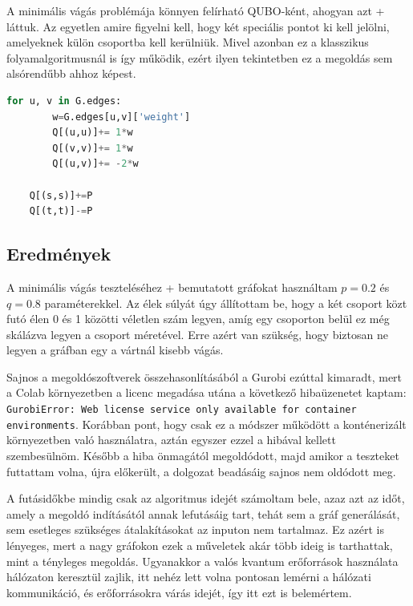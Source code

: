A minimális vágás problémája könnyen felírható QUBO-ként, ahogyan azt \az+ láttuk. Az egyetlen amire figyelni kell, hogy két speciális pontot ki kell jelölni, amelyeknek külön csoportba kell kerülniük. Mivel azonban ez a klasszikus folyamalgoritmusnál is így működik, ezért ilyen tekintetben ez a megoldás sem alsórendűbb ahhoz képest.

\begin{lstlisting}[language=python,caption=Minimális vágás QUBO előállítása,label=code:minCutQUBO]
	for u, v in G.edges:
		w=G.edges[u,v]['weight']
		Q[(u,u)]+= 1*w
		Q[(v,v)]+= 1*w
		Q[(u,v)]+= -2*w
	
	Q[(s,s)]+=P
	Q[(t,t)]-=P
\end{lstlisting}


\subsection{Eredmények}

A minimális vágás teszteléséhez \az+ bemutatott gráfokat használtam $p=0.2$ és $q=0.8$ paraméterekkel. Az élek súlyát úgy állítottam be, hogy a két csoport közt futó élen 0 és 1 közötti véletlen szám legyen, amíg egy csoporton belül ez még skálázva legyen a csoport méretével. Erre azért van szükség, hogy biztosan ne legyen a gráfban egy a vártnál kisebb vágás.

Sajnos a megoldószoftverek összehasonlításából a Gurobi ezúttal kimaradt, mert a Colab környezetben a licenc megadása utána a következő hibaüzenetet kaptam: \verb+GurobiError: Web license service only available for container environments+.
Korábban pont, hogy csak ez a módszer működött a konténerizált környezetben való használatra, aztán egyszer ezzel a hibával kellett szembesülnöm. Később a hiba önmagától megoldódott, majd amikor a teszteket futtattam volna, újra előkerült, a dolgozat beadásáig sajnos nem oldódott meg.

A futásidőkbe mindig csak az algoritmus idejét számoltam bele, azaz azt az időt, amely a megoldó indításától annak lefutásáig tart, tehát sem a gráf generálását, sem esetleges szükséges átalakításokat az inputon nem tartalmaz. Ez azért is lényeges, mert a nagy gráfokon ezek a műveletek akár több ideig is tarthattak, mint a tényleges megoldás. Ugyanakkor a valós kvantum erőforrások használata hálózaton keresztül zajlik, itt nehéz lett volna pontosan lemérni a hálózati kommunikáció, és erőforrásokra várás idejét, így itt ezt is belemértem. 

